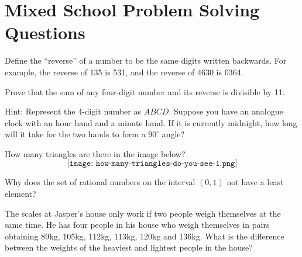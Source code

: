 \documentclass[a4paper,12pt]{exam}
\begin{document}
\pagestyle{empty}
\section*{Mixed School Problem Solving Questions}
\begin{questions}
  \question Define the “reverse” of a number to be the same digits written backwards. For example, the reverse of 135 is 531, and the reverse of 4630 is 0364. 

Prove that the sum of any four-digit number and its reverse is divisible by 11. 

Hint: Represent the 4-digit number as $ABCD$. 
    \question Suppose you have an analogue clock with an hour hand and a minute hand. If it is currently midnight, how long will it take for the two hands to form a $90^{\circ}$ angle? 

    \question How many triangles are there in the image below?
    \[  \texttt{[image: how-many-triangles-do-you-see-1.png]}\]

      \question 

      \question Why does the set of rational numbers on the interval \((0,1)\) not have a least element?

      \question

      \question  The scales at Jasper’s house only work if two people weigh themselves at
    the same time. He has four people in his house who weigh themselves in
    pairs obtaining 89kg, 105kg, 112kg, 113kg, 120kg and 136kg. What is the
    difference between the weights of the heaviest and lightest people in the
    house?

      
\end{questions}
  




\end{document}
